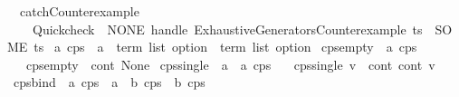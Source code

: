 \begin{isabellebody}
{\isacharbar}{\kern0pt}\ \ catch{\isacharunderscore}{\kern0pt}Counterexample\ {\isasymrightharpoonup}\isanewline
\ \ \ \ {\isacharparenleft}{\kern0pt}Quickcheck{\isacharparenright}{\kern0pt}\ {\isachardoublequoteopen}{\isacharparenleft}{\kern0pt}{\isacharparenleft}{\kern0pt}{\isacharparenleft}{\kern0pt}{\isacharunderscore}{\kern0pt}{\isacharparenright}{\kern0pt}{\isacharsemicolon}{\kern0pt}\ NONE{\isacharparenright}{\kern0pt}\ handle\ Exhaustive{\isacharprime}{\kern0pt}{\isacharunderscore}{\kern0pt}Generators{\isachardot}{\kern0pt}Counterexample\ ts\ {\isasymRightarrow}\ SOME\ ts{\isacharparenright}{\kern0pt}{\isachardoublequoteclose}%
\isadelimdocument
%
\endisadelimdocument
%
\isatagdocument
%
\isamarkuptrue%
%
\endisatagdocument
{\isafolddocument}%
%
\isadelimdocument
%
\endisadelimdocument
{}\isamarkupfalse%
\ {\isacharprime}{\kern0pt}a\ cps\ {\isacharequal}{\kern0pt}\ {\isachardoublequoteopen}{\isacharparenleft}{\kern0pt}{\isacharprime}{\kern0pt}a\ {\isasymRightarrow}\ term\ list\ option{\isacharparenright}{\kern0pt}\ {\isasymRightarrow}\ term\ list\ option{\isachardoublequoteclose}\isanewline
\isanewline
{}\isamarkupfalse%
\ cps{\isacharunderscore}{\kern0pt}empty\ {\isacharcolon}{\kern0pt}{\isacharcolon}{\kern0pt}\ {\isachardoublequoteopen}{\isacharprime}{\kern0pt}a\ cps{\isachardoublequoteclose}\isanewline
\ \ \ {\isachardoublequoteopen}cps{\isacharunderscore}{\kern0pt}empty\ {\isacharequal}{\kern0pt}\ {\isacharparenleft}{\kern0pt}{\isasymlambda}cont{\isachardot}{\kern0pt}\ None{\isacharparenright}{\kern0pt}{\isachardoublequoteclose}\isanewline
\isanewline
{}\isamarkupfalse%
\ cps{\isacharunderscore}{\kern0pt}single\ {\isacharcolon}{\kern0pt}{\isacharcolon}{\kern0pt}\ {\isachardoublequoteopen}{\isacharprime}{\kern0pt}a\ {\isasymRightarrow}\ {\isacharprime}{\kern0pt}a\ cps{\isachardoublequoteclose}\isanewline
\ \ \ {\isachardoublequoteopen}cps{\isacharunderscore}{\kern0pt}single\ v\ {\isacharequal}{\kern0pt}\ {\isacharparenleft}{\kern0pt}{\isasymlambda}cont{\isachardot}{\kern0pt}\ cont\ v{\isacharparenright}{\kern0pt}{\isachardoublequoteclose}\isanewline
\isanewline
{}\isamarkupfalse%
\ cps{\isacharunderscore}{\kern0pt}bind\ {\isacharcolon}{\kern0pt}{\isacharcolon}{\kern0pt}\ {\isachardoublequoteopen}{\isacharprime}{\kern0pt}a\ cps\ {\isasymRightarrow}\ {\isacharparenleft}{\kern0pt}{\isacharprime}{\kern0pt}a\ {\isasymRightarrow}\ {\isacharprime}{\kern0pt}b\ cps{\isacharparenright}{\kern0pt}\ {\isasymRightarrow}\ {\isacharprime}{\kern0pt}b\ cps{\isachardoublequoteclose}\isanewline

\end{isabellebody}
